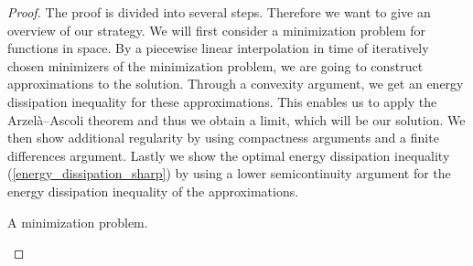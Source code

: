 \begin{proof}
	The proof is divided into several steps. Therefore we want to give an 
	overview of our strategy. We will first consider a minimization problem for 
	functions in space. By a piecewise linear interpolation in time of 
	iteratively chosen minimizers of the minimization problem, we are going to 
	construct approximations to the solution. Through a convexity argument, we 
	get an energy dissipation inequality for these approximations. This enables 
	us to apply the Arzelà--Ascoli theorem and thus we obtain 
	a limit, which will be our solution. 
	We then show additional regularity by 
	using compactness arguments and a finite differences argument. Lastly we 
	show the optimal energy dissipation inequality 
	(\ref{energy_dissipation_sharp}) by using a lower semicontinuity argument 
	for the energy dissipation inequality of the approximations.
	\begin{description}[wide=0pt]
		\item[Step 1:] A minimization problem.
		

\end{description}
\end{proof}
